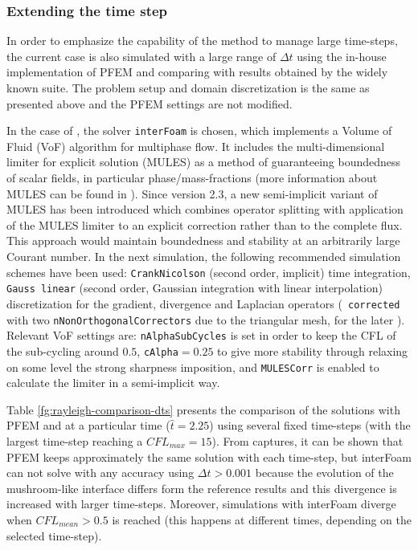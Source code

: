 \subsubsection{Extending the time step}

In order to emphasize the capability of the method to manage large time-steps, the current case is also simulated with a large range of $\Delta t$ using the in-house implementation of PFEM and comparing with results obtained by the widely known \OF suite. The problem setup and domain discretization is the same as presented above and the PFEM settings are not modified.

In the case of \OF, the solver \texttt{interFoam} is chosen, which implements a Volume of Fluid (VoF) algorithm for multiphase flow\cite{Berberovic09}\cite{Marquez2014}. It includes the multi-dimensional limiter for explicit solution (MULES) as a method of guaranteeing boundedness of scalar fields, in particular phase/mass-fractions (more information about MULES can be found in \cite{Marquez13}). Since \OF version 2.3, a new semi-implicit variant of MULES has been introduced which combines operator splitting with application of the MULES limiter to an explicit correction rather than to the complete flux. This approach would maintain boundedness and stability at an arbitrarily large Courant number. In the next simulation, the following recommended simulation schemes have been used: \texttt{CrankNicolson} (second order, implicit) time integration, \texttt{Gauss linear} (second order, Gaussian integration with linear interpolation) discretization for the gradient, divergence and Laplacian operators (\texttt{
corrected} with two \texttt{nNonOrthogonalCorrectors} due to the triangular mesh, for the later ). Relevant VoF settings are: \texttt{nAlphaSubCycles} is set in order to keep the CFL of the sub-cycling around $0.5$, \texttt{cAlpha}$=0.25$ to give more stability through relaxing on some level the strong sharpness imposition, and \texttt{MULESCorr} is enabled to calculate the limiter in a semi-implicit way.

Table \ref{fg:rayleigh-comparison-dts} presents the comparison of the solutions with PFEM and \OF at a particular time ($\widehat{t}=2.25$) using several fixed time-steps (with the largest time-step reaching a $CFL_{max}=15$). From captures, it can be shown that PFEM keeps approximately the same solution with each time-step, but interFoam can not solve with any accuracy using $\Delta t>0.001$ because the evolution of the mushroom-like interface differs form the reference results and this divergence is increased with larger time-steps. Moreover, simulations with interFoam diverge when $CFL_{mean}>0.5$ is reached (this happens at different times, depending on the selected time-step).


